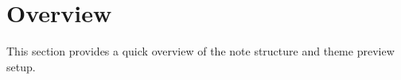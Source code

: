 \documentclass[../main.tex]{subfiles}
\begin{document}
\section{Overview}

This section provides a quick overview of the note structure and theme preview setup.
\end{document}
